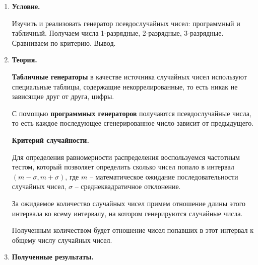 \documentclass[a4paper,14pt]{extreport} %
\begin{document}
\begin{enumerate}

\item \textbf{Условие. }

Изучить и реализовать генератор псевдослучайных чисел: программный и табличный. Получаем числа 1-разрядные, 2-разрядные, 3-разрядные. Сравниваем по критерию. Вывод.  

\item \textbf{Теория. }

\textbf{Табличные генераторы} в качестве источника случайных чисел используют специальные таблицы, содержащие некоррелированные, то есть никак не зависящие друг от друга, цифры.

С помощью  \textbf{программных генераторов} получаются псевдослучайные числа, то есть каждое последующее сгенерированное число зависит от предыдущего. 

 \textbf{Критерий случайности. }
 
Для определения равномерности распределения воспользуемся частотным тестом, который позволяет определить сколько чисел попало в интервал $(m-\sigma, m+\sigma)$, где $m$ -- математическое ожидание последовательности случайных чисел, $\sigma$ -- среднеквадратичное отклонение. 
 
За ожидаемое количество случайных чисел примем отношение длины этого интервала ко всему интервалу, на котором генерируются случайные числа. 

Полученным количеством будет отношение чисел попавших в этот интервал к общему числу случайных чисел.  

\item \textbf{Полученные результаты. }


\end{enumerate}
\end{document}
